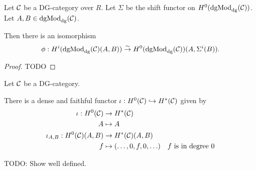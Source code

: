 
\begin{proposition}
    \label{prop:H^i_dgmod_cong_H^0_with_shift}
    Let \( {\mathcal{C}} \) be a DG-category over \( R \). Let \( \Sigma \) be the shift functor on \( H^0(\operatorname{dgMod}_{\operatorname{dg}}({\mathcal{C}})) \). Let \( A, B \in \operatorname{dgMod}_{\operatorname{dg}}({\mathcal{C}}) \).

    Then there is an isomorphism
    \[
        \phi: H^i(\operatorname{dgMod}_{\operatorname{dg}}({\mathcal{C}})(A, B)) \stackrel{\sim}{\to} H^0(\operatorname{dgMod}_{\operatorname{dg}}({\mathcal{C}}))(A, \Sigma^i(B)).
    \]
\end{proposition}
\begin{proof}
    TODO
\end{proof}

\begin{remark}
    \label{rem:H^0_into_H^*_inclusion}
    Let \( {\mathcal{C}} \) be a DG-category.

    There is a dense and faithful functor \( \iota: H^0({\mathcal{C}}) \hookrightarrow H^*({\mathcal{C}}) \) given by
    \begin{align*}
        \iota: H^0(\Cc) &\to H^*(\Cc) \\
        A &\mapsto A \\
        \iota_{A, B}: H^0(\Cc)(A, B) &\to H^*(\Cc)(A, B) \\
        f &\mapsto \tuple{\dots, 0, f, 0, \dots} \quad \text{\( f \) is in degree \( 0 \)}
    \end{align*}

    TODO: Show well defined.
\end{remark}

